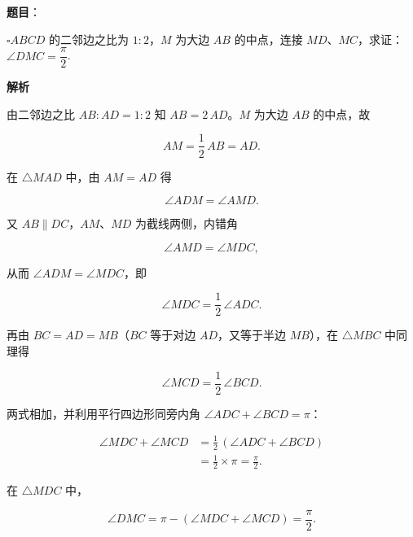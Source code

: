 \begin{answer}

\textbf{题目}：

$\square ABCD$ 的二邻边之比为 $1:2$，$M$ 为大边 $AB$ 的中点，连接 $MD$、$MC$，求证：$\angle DMC=\dfrac{\pi}{2}$.
\nopagebreak[4]
\begin{center}\end{center}
\nopagebreak[4]
\textbf{解析}

由二邻边之比 $AB:AD=1:2$ 知 $AB=2\,AD$。$M$ 为大边 $AB$ 的中点，故

\nopagebreak[4]
\[
AM=\frac12\,AB=AD.
\]

在 $\triangle MAD$ 中，由 $AM=AD$ 得

\nopagebreak[4]
\[
\angle ADM=\angle AMD.
\]

又 $AB\parallel DC$，$AM$、$MD$ 为截线两侧，内错角

\nopagebreak[4]
\[
\angle AMD=\angle MDC,
\]

从而 $\angle ADM=\angle MDC$，即

\nopagebreak[4]
\[
\angle MDC=\frac12\,\angle ADC.
\]

再由 $BC=AD=MB$（$BC$ 等于对边 $AD$，又等于半边 $MB$），在 $\triangle MBC$ 中同理得

\nopagebreak[4]
\[
\angle MCD=\frac12\,\angle BCD.
\]

两式相加，并利用平行四边形同旁内角 $\angle ADC+\angle BCD=\pi$：

\nopagebreak[4]
\[
\begin{aligned}
\angle MDC+\angle MCD
&=\frac12\,(\angle ADC+\angle BCD)\\
&=\frac12\times\pi=\frac{\pi}{2}.
\end{aligned}
\]

在 $\triangle MDC$ 中，

\nopagebreak[4]
\[
\angle DMC=\pi-(\angle MDC+\angle MCD)=\frac{\pi}{2}.
\]
\nopagebreak[4]
\begin{center}\end{center}
\nopagebreak[4]

\end{answer}
